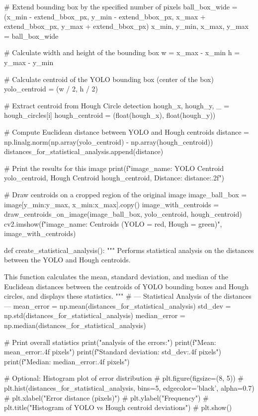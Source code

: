         # Extend bounding box by the specified number of pixels
        ball_box_wide = (x_min - extend_bbox_px, y_min - extend_bbox_px, x_max + extend_bbox_px, y_max + extend_bbox_px)
        x_min, y_min, x_max, y_max = ball_box_wide

        # Calculate width and height of the bounding box
        w = x_max - x_min
        h = y_max - y_min

        # Calculate centroid of the YOLO bounding box (center of the box)
        yolo_centroid = (w / 2, h / 2)

        # Extract centroid from Hough Circle detection
        hough_x, hough_y, _ = hough_circles[i]
        hough_centroid = (float(hough_x), float(hough_y))

        # Compute Euclidean distance between YOLO and Hough centroids
        distance = np.linalg.norm(np.array(yolo_centroid) - np.array(hough_centroid))
        distances_for_statistical_analysis.append(distance)

        # Print the results for this image
        print(f"{image_name}: YOLO Centroid {yolo_centroid}, Hough Centroid {hough_centroid}, Distance: {distance:.2f}")

        # Draw centroids on a cropped region of the original image
        image_ball_box = image[y_min:y_max, x_min:x_max].copy()
        image_with_centroids = draw_centroids_on_image(image_ball_box, yolo_centroid, hough_centroid)
        cv2.imshow(f"{image_name}: Centroids (YOLO = red, Hough = green)", image_with_centroids)


def create_statistical_analysis():
    """
    Performs statistical analysis on the distances between the YOLO and Hough centroids.

    This function calculates the mean, standard deviation, and median of the Euclidean distances between
    the centroids of YOLO bounding boxes and Hough circles, and displays these statistics.
    """
    # --- Statistical Analysis of the distances ---
    mean_error = np.mean(distances_for_statistical_analysis)
    std_dev = np.std(distances_for_statistical_analysis)
    median_error = np.median(distances_for_statistical_analysis)

    # Print overall statistics
    print("\nStatistical analysis of the errors:")
    print(f"Mean: {mean_error:.4f} pixels")
    print(f"Standard deviation: {std_dev:.4f} pixels")
    print(f"Median: {median_error:.4f} pixels")

    # Optional: Histogram plot of error distribution
    # plt.figure(figsize=(8, 5))
    # plt.hist(distances_for_statistical_analysis, bins=5, edgecolor='black', alpha=0.7)
    # plt.xlabel("Error distance (pixels)")
    # plt.ylabel("Frequency")
    # plt.title("Histogram of YOLO vs Hough centroid deviations")
    # plt.show()


